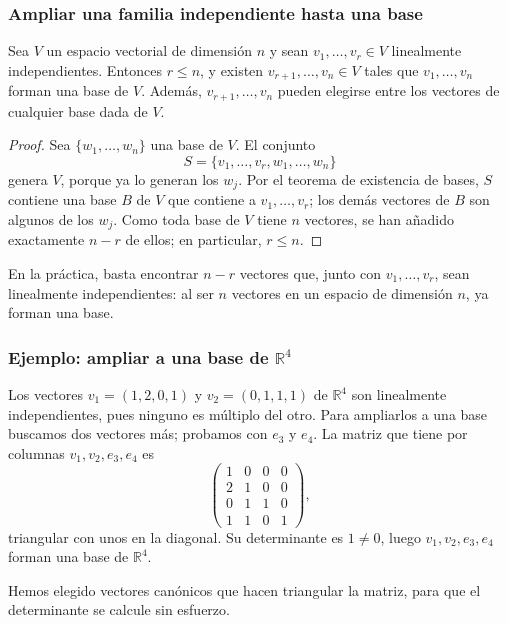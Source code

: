\begin{frame}[allowframebreaks,t]
    \frametitle{Ampliar una familia independiente hasta una base}

    \begin{corollary}
        Sea \(V\) un espacio vectorial de dimensión \(n\) y sean
        \(v_1,\ldots,v_r\in V\) linealmente independientes. Entonces
        \(r\leq n\), y existen \(v_{r+1},\ldots,v_n\in V\) tales que
        \(v_1,\ldots,v_n\) forman una base de \(V\). Además,
        \(v_{r+1},\ldots,v_n\) pueden elegirse entre los vectores de
        cualquier base dada de \(V\).
    \end{corollary}

    \begin{proof}
        Sea \(\{w_1,\ldots,w_n\}\) una base de \(V\). El conjunto
        \[
            S=\{v_1,\ldots,v_r,w_1,\ldots,w_n\}
        \]
        genera \(V\), porque ya lo generan los \(w_j\). Por el teorema de
        existencia de bases, \(S\) contiene una base \(B\) de \(V\) que
        contiene a \(v_1,\ldots,v_r\); los demás vectores de \(B\) son
        algunos de los \(w_j\). Como toda base de \(V\) tiene \(n\)
        vectores, se han añadido exactamente \(n-r\) de ellos; en
        particular, \(r\leq n\).
    \end{proof}

    \medskip

    En la práctica, basta encontrar \(n-r\) vectores que, junto con
    \(v_1,\ldots,v_r\), sean \alert{linealmente independientes}: al ser
    \(n\) vectores en un espacio de dimensión \(n\), ya forman una base.
\end{frame}


\begin{frame}
    \frametitle{Ejemplo: ampliar a una base de \(\mathbb{R}^4\)}

    \begin{example}
        Los vectores \(v_1=(1,2,0,1)\) y \(v_2=(0,1,1,1)\) de
        \(\mathbb{R}^4\) son linealmente independientes, pues ninguno es
        múltiplo del otro. Para ampliarlos a una base buscamos dos vectores
        más; probamos con \(e_3\) y \(e_4\). La matriz que tiene por
        columnas \(v_1,v_2,e_3,e_4\) es
        \[
            \begin{pmatrix}
                1&0&0&0\\
                2&1&0&0\\
                0&1&1&0\\
                1&1&0&1
            \end{pmatrix},
        \]
        triangular con unos en la diagonal. Su determinante es \(1\neq0\),
        luego \(v_1,v_2,e_3,e_4\) forman una base de \(\mathbb{R}^4\).
    \end{example}

    \medskip

    Hemos elegido vectores canónicos que hacen \alert{triangular} la
    matriz, para que el determinante se calcule sin esfuerzo.
\end{frame}

